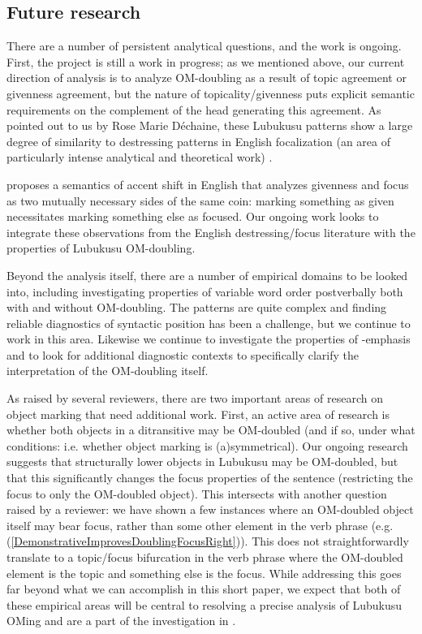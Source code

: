 \documentclass[output=paper]{langscibook}
\begin{document}
\subsection{Future research}\largerpage[-1]

There are a number of persistent analytical questions, and the work is ongoing. First, the project is still a work in progress; as we mentioned above, our current direction of analysis is to analyze OM-doubling as a result of topic agreement or givenness agreement, but the nature of topicality/givenness puts explicit semantic requirements on the complement of the head generating this agreement. As pointed out to us by Rose Marie Déchaine, these Lubukusu patterns show a large degree of similarity to  destressing patterns in English focalization (an area of particularly intense analytical and theoretical work) \citep{Wagner:2012:FocusGivenness,Williams:1997:BlockingAnaphora,Schwarzschild:1999:Givenness}.

\citet{Wagner:2012:FocusGivenness} proposes a semantics of accent shift in English that analyzes givenness and focus as two mutually necessary sides of the same coin: marking something as given necessitates marking something else as focused. Our ongoing work looks to integrate these observations from the English destressing/focus literature with the properties of Lubukusu OM-doubling.

Beyond the analysis itself, there are a number of empirical domains to be looked into, including investigating properties of variable word order postverbally both with and without OM-doubling. The patterns are quite complex and finding reliable diagnostics of syntactic position has been a challenge, but we continue to work in this area. Likewise we continue to investigate the properties of \Ne-emphasis and to look for additional diagnostic contexts to specifically clarify the interpretation of the OM-doubling itself. 

As raised by several reviewers, there are two important areas of research on object marking that need additional work. First, an active area of research is whether both objects in a ditransitive may be OM-doubled (and if so, under what conditions: i.e. whether object marking is (a)symmetrical). Our ongoing research suggests that structurally lower objects in Lubukusu may be OM-doubled, but that this significantly changes the focus properties of the sentence (restricting the focus to only the OM-doubled object). This intersects with another question raised by a reviewer: we have shown a few instances where an OM-doubled object itself may bear focus, rather than some other element in the verb phrase (e.g. (\ref{DemonstrativeImprovesDoublingFocusRight})). This does not straightforwardly translate to a topic/focus bifurcation in the verb phrase where the OM-doubled element is the topic and something else is the focus. While addressing this goes far beyond what we can accomplish in this short paper, we expect that both of these empirical areas will be central to resolving a precise analysis of Lubukusu OMing and are a part of the investigation in \citet{SikukuDiercks2020BukusuOmBook}.  
\end{document}
